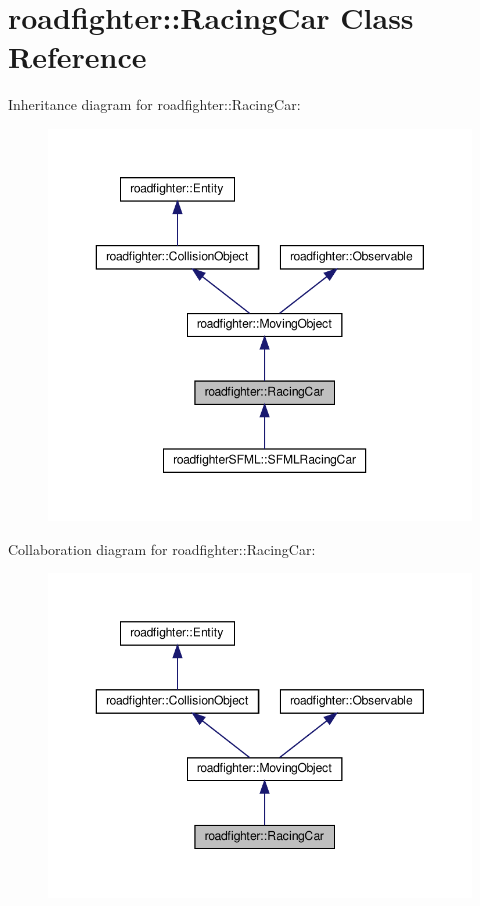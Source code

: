 \hypertarget{classroadfighter_1_1RacingCar}{}\section{roadfighter\+:\+:Racing\+Car Class Reference}
\label{classroadfighter_1_1RacingCar}


Inheritance diagram for roadfighter\+:\+:Racing\+Car\+:
\nopagebreak
\begin{figure}[H]
\begin{center}
\leavevmode
\includegraphics[width=350pt]{classroadfighter_1_1RacingCar__inherit__graph}
\end{center}
\end{figure}


Collaboration diagram for roadfighter\+:\+:Racing\+Car\+:
\nopagebreak
\begin{figure}[H]
\begin{center}
\leavevmode
\includegraphics[width=350pt]{classroadfighter_1_1RacingCar__coll__graph}
\end{center}
\end{figure}
